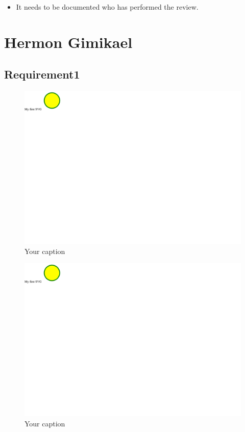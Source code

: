 \documentclass{article}
\begin{document}
\begin{itemize}
\item
  It needs to be documented who has performed the review.
\end{itemize}
\newpage

\section{Hermon Gimikael}

	\subsection{Requirement1}
		\begin{figure}[h!]
		    \centering
		    \captionsetup{labelformat=empty}
		    \caption{Your caption}
		    \includegraphics[width=\textwidth, angle=0]{Kreis2.pdf}
		\end{figure}
		\newpage
		\begin{figure}[h!]
		    \centering
		    \captionsetup{labelformat=empty}
		    \caption{Your caption}
		    \includegraphics[width=\textwidth, angle=0]{Kreis2.pdf}
		\end{figure}
		\newpage
	
\end{document}
